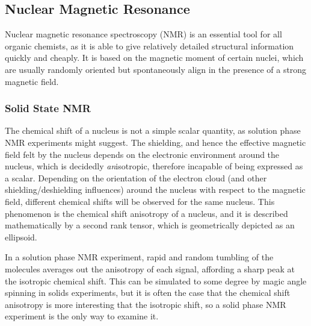 \begin{refsection}
\subsection{Nuclear Magnetic Resonance}
Nuclear magnetic resonance spectroscopy (NMR) is an essential tool for all organic chemists, as it is able to give relatively detailed structural information quickly and cheaply.
It is based on the magnetic moment of certain nuclei, which are usually randomly oriented but spontaneously align in the presence of a strong magnetic field.

\subsubsection{Solid State NMR}
The chemical shift of a nucleus is not a simple scalar quantity, as solution phase NMR experiments might suggest.
The shielding, and hence the effective magnetic field felt by the nucleus depends on the electronic environment around the nucleus, which is decidedly \emph{an}isotropic, therefore incapable of being expressed as a scalar.
Depending on the orientation of the electron cloud (and other shielding/deshielding influences) around the nucleus with respect to the magnetic field, different chemical shifts will be observed for the same nucleus.
This phenomenon is the chemical shift anisotropy of a nucleus, and it is described mathematically by a second rank tensor, which is geometrically depicted as an ellipsoid.

In a solution phase NMR experiment, rapid and random tumbling of the molecules averages out the anisotropy of each signal, affording a sharp peak at the isotropic chemical shift.
This can be simulated to some degree by magic angle spinning in solids experiments, but it is often the case that the chemical shift anisotropy is more interesting that the isotropic shift, so a solid phase NMR experiment is the only way to examine it.


\end{refsection}
